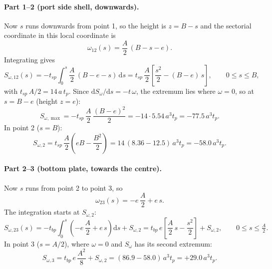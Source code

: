 \paragraph{Part 1--2 (port side shell, downwards).}
Now $s$ runs downwards from point 1, so the height is $z = B - s$ and the sectorial
coordinate in this local coordinate is
\begin{equation}
    \omega_{12}(s) = \frac{A}{2}\,(B - s - e) .
\end{equation}
Integrating gives
\begin{equation}
    S_{\omega,12}(s) = -t_{sp}\int_0^s \frac{A}{2}\,(B - e - s)\,\mathrm{d}s
    = t_{sp}\,\frac{A}{2}\left[\frac{s^2}{2} - (B-e)\,s\right],
    \qquad 0 \le s \le B ,
\end{equation}
with $t_{sp}\,A/2 = 14\,a\,t_p$. Since $\mathrm{d}S_\omega/\mathrm{d}s = -t\,\omega$,
the extremum lies where $\omega = 0$, so at $s = B-e$ (height $z=e$):
\begin{equation}
    S_{\omega,\max} = -t_{sp}\,\frac{A}{2}\,\frac{(B-e)^2}{2}
    = -14 \cdot 5.54\,a^3t_p = -77.5\,a^3t_p .
\end{equation}
In point 2 ($s = B$):
\begin{equation}
    S_{\omega,2} = t_{sp}\,\frac{A}{2}\left(eB - \frac{B^2}{2}\right)
    = 14\,(8.36 - 12.5)\,a^3t_p = -58.0\,a^3t_p .
\end{equation}

\paragraph{Part 2--3 (bottom plate, towards the centre).}
Now $s$ runs from point 2 to point 3, so
\begin{equation}
    \omega_{23}(s) = -e\,\frac{A}{2} + e\,s .
\end{equation}
The integration starts at $S_{\omega,2}$:
\begin{equation}
    S_{\omega,23}(s) = -t_{bp}\int_0^s \left(-e\,\frac{A}{2} + e\,s\right)\mathrm{d}s
                       + S_{\omega,2}
    = t_{bp}\,e\left[\frac{A}{2}\,s - \frac{s^2}{2}\right] + S_{\omega,2},
    \qquad 0 \le s \le \tfrac{A}{2}.
\end{equation}
In point 3 ($s = A/2$), where $\omega = 0$ and $S_\omega$ has its second extremum:
\begin{equation}
    S_{\omega,3} = t_{bp}\,e\,\frac{A^2}{8} + S_{\omega,2}
    = (86.9 - 58.0)\,a^3t_p = +29.0\,a^3t_p .
\end{equation}

